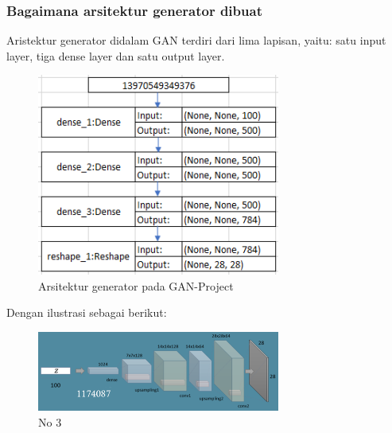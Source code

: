 \subsubsection{Bagaimana arsitektur generator dibuat}
\hfill\break
Aristektur generator didalam GAN terdiri dari lima lapisan, yaitu: satu input layer, tiga dense layer dan satu output layer.
\begin{figure}[H]
	\centering
	\includegraphics[width=8cm]{figures/1174087/8/3a.png}
	\caption{Arsitektur generator pada GAN-Project}
\end{figure}
Dengan ilustrasi sebagai berikut:
\begin{figure}[H]
	\centering
	\includegraphics[width=8cm]{figures/1174087/8/3.png}
	\caption{No 3}
\end{figure}

